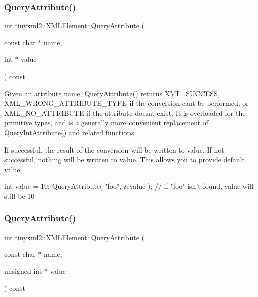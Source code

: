 \subsubsection{\texorpdfstring{Query\+Attribute()}{QueryAttribute()}\hspace{0.1cm}{\footnotesize\ttfamily [1/6]}}
{\footnotesize\ttfamily int tinyxml2\+::\+X\+M\+L\+Element\+::\+Query\+Attribute (\begin{DoxyParamCaption}\item[{const char $\ast$}]{name,  }\item[{int $\ast$}]{value }\end{DoxyParamCaption}) const\hspace{0.3cm}{\ttfamily [inline]}}

Given an attribute name, \hyperlink{classtinyxml2_1_1_x_m_l_element_a042fc30504347b84a56cf863ad528a4f}{Query\+Attribute()} returns X\+M\+L\+\_\+\+S\+U\+C\+C\+E\+SS, X\+M\+L\+\_\+\+W\+R\+O\+N\+G\+\_\+\+A\+T\+T\+R\+I\+B\+U\+T\+E\+\_\+\+T\+Y\+PE if the conversion can\textquotesingle{}t be performed, or X\+M\+L\+\_\+\+N\+O\+\_\+\+A\+T\+T\+R\+I\+B\+U\+TE if the attribute doesn\textquotesingle{}t exist. It is overloaded for the primitive types, and is a generally more convenient replacement of \hyperlink{classtinyxml2_1_1_x_m_l_element_a8a78bc1187c1c45ad89f2690eab567b1}{Query\+Int\+Attribute()} and related functions.

If successful, the result of the conversion will be written to \textquotesingle{}value\textquotesingle{}. If not successful, nothing will be written to \textquotesingle{}value\textquotesingle{}. This allows you to provide default value\+:

\begin{DoxyVerb}int value = 10;
QueryAttribute( "foo", &value );        // if "foo" isn't found, value will still be 10
\end{DoxyVerb}
 \mbox{\label{classtinyxml2_1_1_x_m_l_element_a187e8b686fbe071732aea2e2ee766f86}} 
\subsubsection{\texorpdfstring{Query\+Attribute()}{QueryAttribute()}\hspace{0.1cm}{\footnotesize\ttfamily [2/6]}}
{\footnotesize\ttfamily int tinyxml2\+::\+X\+M\+L\+Element\+::\+Query\+Attribute (\begin{DoxyParamCaption}\item[{const char $\ast$}]{name,  }\item[{unsigned int $\ast$}]{value }\end{DoxyParamCaption}) const\hspace{0.3cm}{\ttfamily [inline]}}

